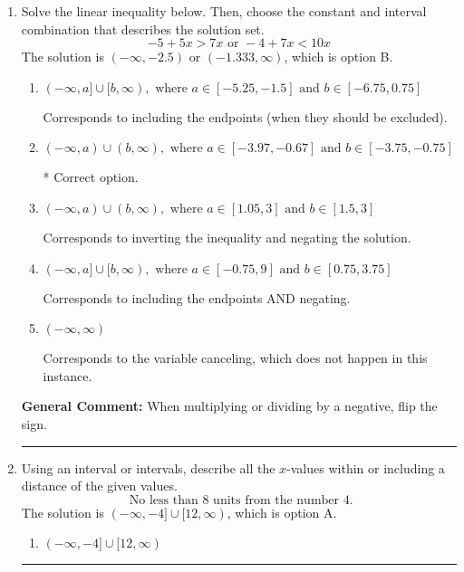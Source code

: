 \documentclass{extbook}[14pt]
\newcommand{\litem}[1]{\item #1

\rule{\textwidth}{0.4pt}}
\begin{document}
\begin{enumerate}
{\begin{enumerate}[label=\Alph*.]
 $(5.0, \infty)$, which corresponds to switching the direction of the interval. You likely did this if you did not flip the inequality when dividing by a negative!
\item \( (-\infty, a), \text{ where } a \in [1, 10] \)

* $(-\infty, 5.0)$, which is the correct option.
\item \( \text{None of the above}. \)

You may have chosen this if you thought the inequality did not match the ends of the intervals.
\end{enumerate}

\textbf{General Comment:} Remember that less/greater than or equal to includes the endpoint, while less/greater do not. Also, remember that you need to flip the inequality when you multiply or divide by a negative.
}
\litem{
Solve the linear inequality below. Then, choose the constant and interval combination that describes the solution set.
\[ -5 + 5 x > 7 x \text{ or } -4 + 7 x < 10 x \]The solution is \( (-\infty, -2.5) \text{ or } (-1.333, \infty) \), which is option B.\begin{enumerate}[label=\Alph*.]
\item \( (-\infty, a] \cup [b, \infty), \text{ where } a \in [-5.25, -1.5] \text{ and } b \in [-6.75, 0.75] \)

Corresponds to including the endpoints (when they should be excluded).
\item \( (-\infty, a) \cup (b, \infty), \text{ where } a \in [-3.97, -0.67] \text{ and } b \in [-3.75, -0.75] \)

 * Correct option.
\item \( (-\infty, a) \cup (b, \infty), \text{ where } a \in [1.05, 3] \text{ and } b \in [1.5, 3] \)

Corresponds to inverting the inequality and negating the solution.
\item \( (-\infty, a] \cup [b, \infty), \text{ where } a \in [-0.75, 9] \text{ and } b \in [0.75, 3.75] \)

Corresponds to including the endpoints AND negating.
\item \( (-\infty, \infty) \)

Corresponds to the variable canceling, which does not happen in this instance.
\end{enumerate}

\textbf{General Comment:} When multiplying or dividing by a negative, flip the sign.
}
\litem{
Using an interval or intervals, describe all the $x$-values within or including a distance of the given values.
\[ \text{ No less than } 8 \text{ units from the number } 4. \]The solution is \( (-\infty, -4] \cup [12, \infty) \), which is option A.\begin{enumerate}[label=\Alph*.]
\item \( (-\infty, -4] \cup [12, \infty) \)


\end{enumerate}}
\end{enumerate}
\end{document}
